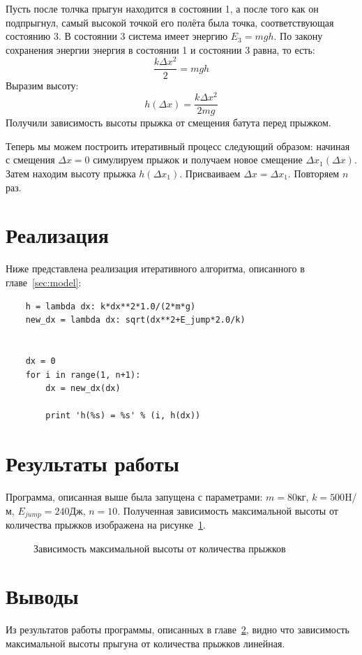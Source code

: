 \documentclass[12pt,a4paper,oneside]{extarticle}
\begin{document}
    Пусть после толчка прыгун находится в состоянии 1, а после того как он подпрыгнул, самый высокой точкой его полёта была точка, соответствующая состоянию 3. В состоянии 3 система имеет энергию $E_3=mgh$. По закону сохранения энергии энергия в состоянии 1 и состоянии 3 равна, то есть:
    $$\frac{k\Delta x^2}{2} = mgh$$
    Выразим высоту:
    $$h(\Delta x) = \frac{k\Delta x^2}{2mg}$$
    Получили зависимость высоты прыжка от смещения батута перед прыжком.

    Теперь мы можем построить итеративный процесс следующий образом: начиная с смещения $\Delta x=0$ симулируем прыжок и получаем новое смещение $\Delta x_1(\Delta x)$. Затем находим высоту прыжка $h(\Delta x_1)$. Присваиваем $\Delta x = \Delta x_1$. Повторяем $n$ раз.
    
\section{Реализация}
    Ниже представлена реализация итеративного алгоритма, описанного в главе~\ref{sec:model}:
    \begin{lstlisting}
    h = lambda dx: k*dx**2*1.0/(2*m*g)
    new_dx = lambda dx: sqrt(dx**2+E_jump*2.0/k)


    dx = 0
    for i in range(1, n+1):
        dx = new_dx(dx)

        print 'h(%s) = %s' % (i, h(dx))
    \end{lstlisting}


\section{Результаты работы}
\label{sec:test}
    Программа, описанная выше была запущена с параметрами: $m=80$кг, $k=500$H/м, $E_{jump}=240$Дж, $n=10$. Полученная зависимость максимальной высоты от количества прыжков изображена на рисунке~\ref{pic:test}.

        \begin{figure}[h!]        
        \centering
        \caption{Зависимость максимальной высоты от количества прыжков}
        \label{pic:test}
        \end{figure}


\section{Выводы}
    Из результатов работы программы, описанных в главе~\ref{sec:test}, видно что зависимость максимальной высоты прыгуна от количества прыжков линейная.
    
\end{document}
